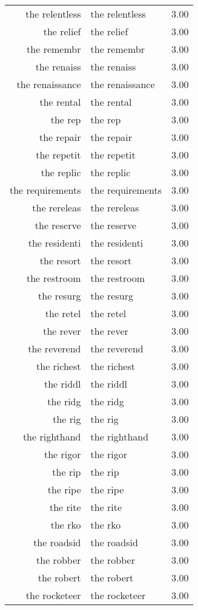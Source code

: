 \begin{table}[ht]
\begin{tabular}{rlr}
  the relentless & the relentless & 3.00 \\ 
  the relief & the relief & 3.00 \\ 
  the remembr & the remembr & 3.00 \\ 
  the renaiss & the renaiss & 3.00 \\ 
  the renaissance & the renaissance & 3.00 \\ 
  the rental & the rental & 3.00 \\ 
  the rep & the rep & 3.00 \\ 
  the repair & the repair & 3.00 \\ 
  the repetit & the repetit & 3.00 \\ 
  the replic & the replic & 3.00 \\ 
  the requirements & the requirements & 3.00 \\ 
  the rereleas & the rereleas & 3.00 \\ 
  the reserve & the reserve & 3.00 \\ 
  the residenti & the residenti & 3.00 \\ 
  the resort & the resort & 3.00 \\ 
  the restroom & the restroom & 3.00 \\ 
  the resurg & the resurg & 3.00 \\ 
  the retel & the retel & 3.00 \\ 
  the rever & the rever & 3.00 \\ 
  the reverend & the reverend & 3.00 \\ 
  the richest & the richest & 3.00 \\ 
  the riddl & the riddl & 3.00 \\ 
  the ridg & the ridg & 3.00 \\ 
  the rig & the rig & 3.00 \\ 
  the righthand & the righthand & 3.00 \\ 
  the rigor & the rigor & 3.00 \\ 
  the rip & the rip & 3.00 \\ 
  the ripe & the ripe & 3.00 \\ 
  the rite & the rite & 3.00 \\ 
  the rko & the rko & 3.00 \\ 
  the roadsid & the roadsid & 3.00 \\ 
  the robber & the robber & 3.00 \\ 
  the robert & the robert & 3.00 \\ 
  the rocketeer & the rocketeer & 3.00 \\ 

\end{tabular}
\end{table}
